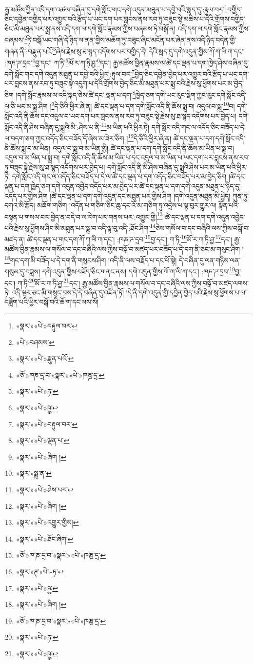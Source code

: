 རྒྱ་མཚོས་བྱིན་འདི་དག་འཚལ་བཞིན་དུ་དགེ་སློང་གང་དགེ་འདུན་མཐུན་པ་དབྱེ་བའི་སླད་དུ་:རྟུལ་བར་\footnote{«སྣར་»«པེ་»བརྟུལ་བར་}བགྱིད་ཅིང་དབྱེན་བགྱིད་པར་འགྱུར་བའི་རྩོད་པ་ཡང་དག་པར་བླངས་ནས་རབ་ཏུ་བཟུང་སྟེ་མཆིས་པ་དེའི་གྲོགས་བགྱིད་ཅིང་མི་མཐུན་པར་སྨྲ་ནས་འདི་དག་ལ་དགེ་སློང་རྣམས་ཀྱིས་བཞམས་ཏེ་བསྒོ་ན། འདི་དག་ལ་དགེ་སློང་རྣམས་ཀྱིས་བཞམས་\footnote{«པེ་»བཤམས་}ཏེ་བསྒོ་ཡང་གཞི་དེ་ཉིད་ལ་ནན་གྱིས་མཆོག་ཏུ་བཟུང་ཞིང་མངོན་པར་ཞེན་ནས་འདི་ཉིད་བདེན་གྱི་གཞན་ནི་:བརྫུན་པའོ་\footnote{«སྣར་»«པེ་»རྫུན་པའོ་}ཞེས་རྗེས་སུ་ཐ་སྙད་འདོགས་པར་བགྱིད་དེ། དེའི་སླད་དུ་དགེ་འདུན་གྱིས་ཀོ་ཀ་ལི་ཀ་དང་། :ཁཎ་ཌ་དྲབ་\footnote{«ཅོ་»ཁཎ་དྲ་བ་«སྣར་»«པེ་»ཁཎྜ་དྲ་}བྱ་དང་། ཀ་ཏི་\footnote{«སྣར་»«པེ་»ཏ་}མོ་ར་ཀ་ཏི་ཤྱ་\footnote{«སྣར་»«པེ་»ཥྱ་}དང་། རྒྱ་མཚོས་བྱིན་རྣམས་ལ་ཚེ་དང་ལྡན་པ་དག་ཁྱེད་ཤེས་བཞིན་དུ་དགེ་སློང་གང་དགེ་འདུན་མཐུན་པ་དབྱེ་བའི་ཕྱིར་:རྟུལ་བར་\footnote{«སྣར་»«པེ་»བརྟུལ་བར་}བྱེད་ཅིང་དབྱེན་བྱེད་པར་འགྱུར་བའི་རྩོད་པ་ཡང་དག་པར་བླངས་ནས་རབ་ཏུ་བཟུང་སྟེ་འདུག་པ་དེའི་གྲོགས་བྱེད་ཅིང་མི་མཐུན་པར་སྨྲ་བའི་རྗེས་སུ་ཕྱོགས་པར་མ་བྱེད་ཅིག །དགེ་སློང་རྣམས་ལ་འདི་སྐད་ཅེས་ཚེ་དང་:ལྡན་པ་དག་\footnote{«སྣར་»«པེ་»ལྡན་པ་}ཁྱེད་ཅག་དགེ་ཡང་རུང་སྡིག་ཀྱང་རུང་དགེ་སློང་འདི་ལ་ཅི་ཡང་མ་སྨྲ་ཤིག །\footnote{«སྣར་»«པེ་»ཞིག །}དེ་ཅིའི་ཕྱིར་ཞེ་ན། ཚེ་དང་ལྡན་པ་དག་དགེ་སློང་འདི་ནི་ཆོས་སྨྲ་བ། འདུལ་བ་སྨྲ་\footnote{«སྣར་»སྨྲ་ན་}བ། དགེ་སློང་འདི་ནི་ཆོས་དང་འདུལ་བ་ཡང་དག་པར་བླངས་ནས་རབ་ཏུ་བཟུང་སྟེ་རྗེས་སུ་ཐ་སྙད་འདོགས་པར་བྱེད་པ། དགེ་སློང་འདི་ནི་ཤེས་བཞིན་དུ་སྨྲའི་མི་:ཤེས་པ་ནི་\footnote{«སྣར་»«པེ་»ཤེས་པར་}མ་ཡིན་པའི་ཕྱིར་ཏེ། དགེ་སློང་འདི་གང་ལ་འདོད་ཅིང་བཟོད་པ་དེ་ལ་བདག་ཅག་ཀྱང་འདོད་ཅིང་བཟོད་དོ་ཞེས་མ་ཟེར་ཅིག །\footnote{«སྣར་»«པེ་»ཞིག །}དེ་ཅིའི་ཕྱིར་ཞེ་ན། ཚེ་དང་ལྡན་པ་དག་དགེ་སློང་འདི་ནི་ཆོས་སྨྲ་བ་མ་ཡིན། འདུལ་བ་སྨྲ་བ་མ་ཡིན་གྱི། ཚེ་དང་ལྡན་པ་དག་དགེ་སློང་འདི་ནི་ཆོས་མ་ཡིན་པ་སྨྲ་བ། འདུལ་བ་མ་ཡིན་པ་སྨྲ་བ། དགེ་སློང་འདི་ནི་ཆོས་མ་ཡིན་པ་དང་འདུལ་བ་མ་ཡིན་པ་ཡང་དག་པར་བླངས་ནས་རབ་ཏུ་བཟུང་སྟེ་རྗེས་སུ་ཐ་སྙད་འདོགས་པར་བྱེད་པ། དགེ་སློང་འདི་ནི་མི་ཤེས་བཞིན་དུ་སྨྲའི་ཤེས་པར་མ་ཡིན་པའི་ཕྱིར་ཏེ། དགེ་སློང་འདི་གང་ལ་འདོད་ཅིང་བཟོད་པ་དེ་ལ་ཚེ་དང་ལྡན་པ་དག་འདོད་ཅིང་བཟོད་པར་མ་བྱེད་ཅིག །ཚེ་དང་ལྡན་པ་དག་ཁྱེད་ཅག་དགེ་འདུན་འབྱེད་འདོད་པར་མ་བྱེད་པར་ཚེ་དང་ལྡན་པ་དག་དགེ་འདུན་མཐུན་པ་ཉིད་དུ་འདོད་པར་གྱིས་ཤིག །ཚེ་དང་ལྡན་པ་དག་དགེ་འདུན་དང་མཐུན་པར་གྱིས་ཤིག །དགེ་འདུན་མཐུན་མི་ཕྱེད། ཀུན་ཏུ་དགའ་མི་རྩོད། མཆོག་གཅིག །འདོན་པ་གཅིག་ཅིང་ཆུ་དང་འོ་མ་གཅིག་ཏུ་འདྲེས་པ་ལྟ་བུར་གྱུར་ལ། སྟོན་པའི་བསྟན་པ་གསལ་བར་བྱེད་ན་བདེ་བ་ལ་རེག་པར་གནས་པར་:འགྱུར་གྱི།\footnote{«སྣར་»«པེ་»འགྱུར་གྱིས།} ཚེ་དང་ལྡན་པ་དག་དགེ་འདུན་འབྱེད་པའི་རྗེས་སུ་ཕྱོགས་ཤིང་མི་མཐུན་པར་སྨྲ་བ་འདི་ལྟ་བུ་འདི་:ཐོང་ཤིག་\footnote{«སྣར་»«པེ་»ཐོང་ཞིག་}ཅེས་གསོལ་བ་དང་བཞིའི་ལས་ཀྱིས་བསྒོ་བ་མཛད་ན། ཚེ་དང་ལྡན་པ་གང་དག་ཀོ་ཀ་ལི་ཀ་དང་། :ཁཎ་ཌ་དྲབ་\footnote{«ཅོ་»ཁ་ཎ་དྲ་བ་«སྣར་»«པེ་»ཁཎྜ་དྲ་}བྱ་དང་། ཀ་ཏི་\footnote{«སྣར་»ཊ་«པེ་»ཏ་}མོ་ར་ཀ་ཏི་ཤྱ་\footnote{«སྣར་»«པེ་»ཥྱ་}དང་། རྒྱ་མཚོས་བྱིན་རྣམས་ལ་གསོལ་བ་དང་བཞིའི་ལས་ཀྱིས་བསྒོ་བ་མཛད་པར་བཟོད་པ་དེ་དག་ནི་ཅང་མ་གསུང་ཤིག །\footnote{«སྣར་»«པེ་»ཞིག །}གང་དག་མི་བཟོད་པ་དེ་དག་ནི་གསུངས་ཤིག །འདི་ནི་ལས་བརྗོད་པ་དང་པོ་སྟེ། དེ་བཞིན་དུ་ལན་གཉིས་ལན་གསུམ་དུ་བཟླས། དགེ་འདུན་གྱིས་བཟོད་ཅིང་གནང་ནས། དགེ་འདུན་གྱིས་ཀོ་ཀ་ལི་ཀ་དང་། :ཁཎ་ཌ་དྲབ་\footnote{«ཅོ་»ཁ་ཎ་དྲ་བ་«སྣར་»«པེ་»ཁཎྜ་དྲ་}བྱ་དང་། ཀ་ཏི་\footnote{«སྣར་»«པེ་»ཏ་}མོ་ར་ཀ་ཏི་ཤྱ་\footnote{«སྣར་»«པེ་»ཥྱ་}དང་། རྒྱ་མཚོས་བྱིན་རྣམས་ལ་གསོལ་བ་དང་བཞིའི་ལས་ཀྱིས་བསྒོ་བ་མཛད་ལགས་ཏེ། འདི་ལྟར་ཅང་མི་གསུང་བས་དེ་དེ་བཞིན་དུ་འཛིན་ཏོ། །དེ་ནི་དགེ་འདུན་གྱི་དབྱེན་བྱེད་པའི་རྗེས་སུ་ཕྱོགས་པ་ལ་བཟློག་པའི་ཕྱིར་བསྒོ་བའི་ཆོ་ག་དང་ལས་སོ། 